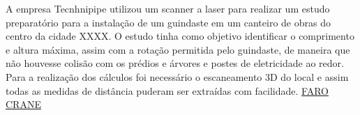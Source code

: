 A empresa Tecnhnipipe utilizou um scanner a laser para realizar um estudo
preparatório para a instalação de um guindaste em um canteiro de obras do centro
da cidade XXXX. O estudo tinha como objetivo identificar o comprimento e altura
máxima, assim com a rotação permitida pelo guindaste, de maneira que não
houvesse colisão com os prédios e árvores e postes de eletricidade ao redor.
Para a realização dos cálculos foi necessário o escaneamento 3D do local e assim
todas as medidas de distância puderam ser extraídas com facilidade.
\href{http://www.faro.com/products/3d-surveying/laser-scanner-faro-focus-3d/case-studies/2011/11/23/technipipe-diversifies-its-activities-using-a-faro-laser-scanner}{FARO
CRANE}
